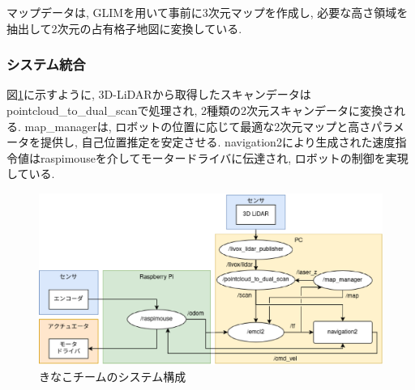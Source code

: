 マップデータは, GLIMを用いて事前に3次元マップを作成し, 必要な高さ領域を抽出して2次元の占有格子地図に変換している. 


\subsubsection{システム統合}
図\ref{fig:kinako_system}に示すように, 3D-LiDARから取得したスキャンデータはpointcloud\_to\_dual\_scanで処理され, 2種類の2次元スキャンデータに変換される. 
map\_managerは, ロボットの位置に応じて最適な2次元マップと高さパラメータを提供し, 自己位置推定を安定させる. 
navigation2により生成された速度指令値はraspimouseを介してモータードライバに伝達され, ロボットの制御を実現している. 

\begin{figure}[h]
  \begin{center}
    \includegraphics[width=1.0\linewidth]{figs/kinako_system.eps}
    \caption{きなこチームのシステム構成}
    \label{fig:kinako_system}
  \end{center}
\end{figure}
